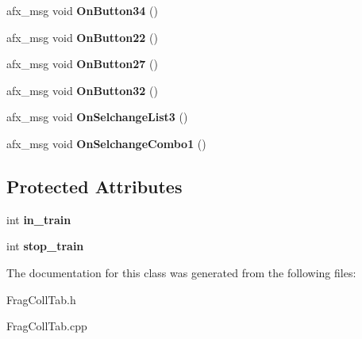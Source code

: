 \begin{DoxyCompactItemize}
\item 
\hypertarget{class_c_frag_coll_tab_a51aeeb9e4412032fb6780c895fae9af4}{afx\-\_\-msg void {\bfseries On\-Button34} ()}\label{class_c_frag_coll_tab_a51aeeb9e4412032fb6780c895fae9af4}

\item 
\hypertarget{class_c_frag_coll_tab_ad575470efb0f9b19db0c4e8883d72480}{afx\-\_\-msg void {\bfseries On\-Button22} ()}\label{class_c_frag_coll_tab_ad575470efb0f9b19db0c4e8883d72480}

\item 
\hypertarget{class_c_frag_coll_tab_aa467f897ab1102fcbe906a33b9393cf4}{afx\-\_\-msg void {\bfseries On\-Button27} ()}\label{class_c_frag_coll_tab_aa467f897ab1102fcbe906a33b9393cf4}

\item 
\hypertarget{class_c_frag_coll_tab_a79e6e670d009fc23f6a8749b31a098bf}{afx\-\_\-msg void {\bfseries On\-Button32} ()}\label{class_c_frag_coll_tab_a79e6e670d009fc23f6a8749b31a098bf}

\item 
\hypertarget{class_c_frag_coll_tab_a2638269b125657eb3d1c3db6490e882e}{afx\-\_\-msg void {\bfseries On\-Selchange\-List3} ()}\label{class_c_frag_coll_tab_a2638269b125657eb3d1c3db6490e882e}

\item 
\hypertarget{class_c_frag_coll_tab_ac33743941220f1b784e2e8a6abc1f015}{afx\-\_\-msg void {\bfseries On\-Selchange\-Combo1} ()}\label{class_c_frag_coll_tab_ac33743941220f1b784e2e8a6abc1f015}

\end{DoxyCompactItemize}
\subsection*{Protected Attributes}
\begin{DoxyCompactItemize}
\item 
\hypertarget{class_c_frag_coll_tab_af52fec8d1f97ffb1df6a361183dc20e9}{int {\bfseries in\-\_\-train}}\label{class_c_frag_coll_tab_af52fec8d1f97ffb1df6a361183dc20e9}

\item 
\hypertarget{class_c_frag_coll_tab_abd92cf06cec3143fb4fc97480168d0aa}{int {\bfseries stop\-\_\-train}}\label{class_c_frag_coll_tab_abd92cf06cec3143fb4fc97480168d0aa}

\end{DoxyCompactItemize}


The documentation for this class was generated from the following files\-:\begin{DoxyCompactItemize}
\item 
Frag\-Coll\-Tab.\-h\item 
Frag\-Coll\-Tab.\-cpp\end{DoxyCompactItemize}
